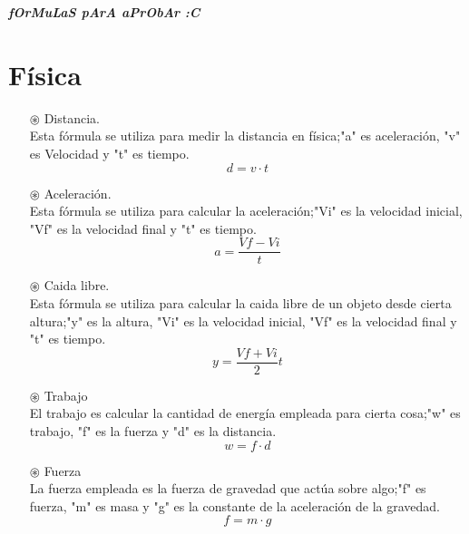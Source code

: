 \documentclass[letterpaper,pt12]{article}
\begin{document}
\textit{\textbf{\huge{fOrMuLaS pArA aPrObAr :C}}} 

\pagestyle{fancy}

\fancyhf{}
 \rfoot{\thepage}
 
\section*{Física}

\begin{itemize}
\item [$\circledast$]{Distancia.}\\
Esta fórmula se utiliza para medir la distancia en física;"a" es aceleración, "v" es Velocidad y "t" es tiempo.
\begin{equation*}
    d=v\cdot t
\end{equation*}

\item [$\circledast$]{Aceleración.}\\
Esta fórmula se utiliza para calcular la aceleración;"Vi" es la velocidad inicial, "Vf" es la velocidad final y "t" es tiempo.
\begin{equation*}
     a=\frac{Vf-Vi}{t}
\end{equation*}

\item [$\circledast$]{Caida libre.}\\
Esta fórmula se utiliza para calcular la caida libre de un objeto desde cierta altura;"y" es la altura, "Vi" es la velocidad inicial, "Vf" es la velocidad final y "t" es tiempo.
\begin{equation*}
    y=\frac{Vf+Vi}{2}t
\end{equation*}

\item [$\circledast$]{Trabajo}\\
El trabajo es calcular la cantidad de energía empleada para cierta cosa;"w" es trabajo, "f" es la fuerza y "d" es la distancia.
\begin{equation*}
    w=f\cdot d
\end{equation*}

\item [$\circledast$]{Fuerza}\\
La fuerza empleada es la fuerza de gravedad que actúa sobre algo;"f" es fuerza, "m" es masa y "g" es la constante de la aceleración de la gravedad. 
\begin{equation*}
    f=m\cdot g
\end{equation*}


\end{itemize}
\end{document}
